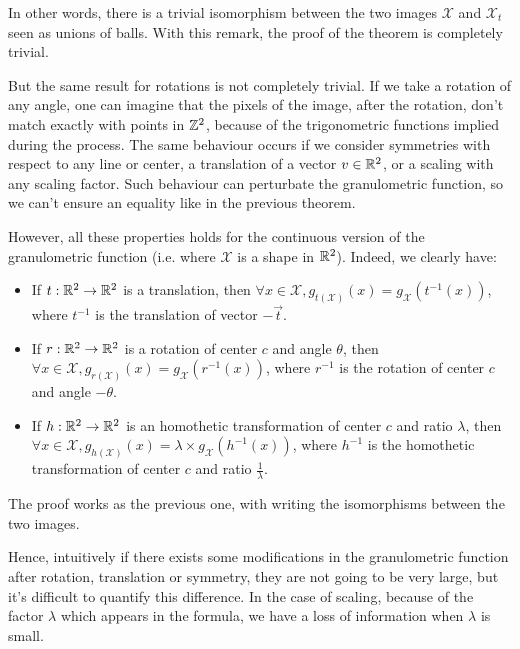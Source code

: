 In other words, there is a trivial isomorphism between the two images $\mathcal{X}$ and  $\mathcal{X}_t$ seen as unions of balls. With this remark, the proof of the theorem is completely trivial.

But the same result for rotations is not completely trivial. If we take a rotation of any angle, one can imagine that the pixels of the image, after the rotation, don't match exactly with points in $\mathbb{Z}^{2}$, because of the trigonometric functions implied during the process. The same behaviour occurs if we consider symmetries with respect to any line or center, a translation of a vector $v \in \mathbb{R}^2$, or a scaling with any scaling factor. Such behaviour can perturbate the granulometric function, so we can't ensure an equality like in the previous theorem.


However, all these properties holds for the continuous version of the granulometric function (i.e. where $\mathcal{X}$ is a shape in $\mathbb{R}^2$). Indeed, we clearly have:

\begin{remarque}
	\begin{itemize}
		\item If $t : \mathbb{R}^2 \to \mathbb{R}^2$ is a translation, then $\forall x \in \mathcal{X}, g_{t(\mathcal{X})}(x) = g_{\mathcal{X}}(t^{-1}(x))$, where $t^{-1}$ is the translation of vector $-\vec{t}$.
		\item If $r : \mathbb{R}^2 \to \mathbb{R}^2$ is a rotation of center $c$ and angle $\theta$, then $\forall x \in \mathcal{X}, g_{r(\mathcal{X})}(x) = g_{\mathcal{X}}(r^{-1}(x))$, where $r^{-1}$ is the rotation of center $c$ and angle $-\theta$. 
		\item If $h : \mathbb{R}^2 \to \mathbb{R}^2$ is an homothetic transformation of center $c$ and ratio $\lambda$, then $\forall x \in \mathcal{X}, g_{h(\mathcal{X})}(x) = \lambda \times g_{\mathcal{X}}(h^{-1}(x))$, where $h^{-1}$ is the homothetic transformation of center $c$ and ratio $\frac{1}{\lambda}$.
	\end{itemize}
\end{remarque}

The proof works as the previous one, with writing the isomorphisms between the two images.

Hence, intuitively if there exists some modifications in the granulometric function after rotation, translation or symmetry, they are not going to be very large, but it's difficult to quantify this difference. In the case of scaling, because of the factor $\lambda$ which appears in the formula, we have a loss of information when $\lambda$ is small.

